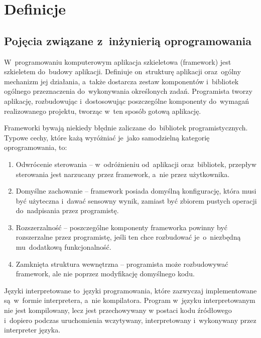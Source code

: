 \section{Definicje} \label{definicje}

\subsection{Pojęcia związane z~inżynierią oprogramowania} \label{definicje.inz_op}

\begin{definition} \label{definicje.inz_op.framework}
W~programowaniu komputerowym aplikacja szkieletowa (framework) jest szkieletem do~budowy aplikacji. Definiuje on~strukturę aplikacji oraz~ogólny mechanizm jej działania, a~także dostarcza zestaw komponentów i~bibliotek ogólnego przeznaczenia do~wykonywania określonych zadań. Programista tworzy aplikację, rozbudowując i~dostosowując poszczególne komponenty do~wymagań realizowanego projektu, tworząc w~ten sposób gotową aplikację\cite{framework}.


Frameworki bywają niekiedy błędnie zaliczane do~bibliotek programistycznych. Typowe cechy, które każą wyróżniać je~jako samodzielną kategorię oprogramowania, to:

\begin{enumerate}
  \item Odwrócenie sterowania -- w~odróżnieniu od~aplikacji oraz~bibliotek, przepływ sterowania jest narzucany przez framework, a~nie przez użytkownika.
  \item Domyślne zachowanie -- framework posiada domyślną konfigurację, która musi być użyteczna i~dawać sensowny wynik, zamiast być zbiorem pustych operacji do~nadpisania przez programistę.
  \item Rozszerzalność -- poszczególne komponenty frameworka powinny być rozszerzalne przez programistę, jeśli ten chce rozbudować je~o~niezbędną mu~dodatkową funkcjonalność.
  \item Zamknięta struktura wewnętrzna -- programista może rozbudowywać framework, ale nie poprzez modyfikację domyślnego kodu.
\end{enumerate}
\end{definition}

\begin{definition} \label{definicje.inz_op.jez_inter}
Języki interpretowane to~języki programowania, które zazwyczaj implementowane są~w~formie interpretera, a~nie kompilatora. Program w~języku interpretowanym nie jest kompilowany, lecz jest przechowywany w postaci kodu źródłowego i~dopiero podczas uruchomienia wczytywany, interpretowany i~wykonywany przez interpreter języka.
\end{definition}

